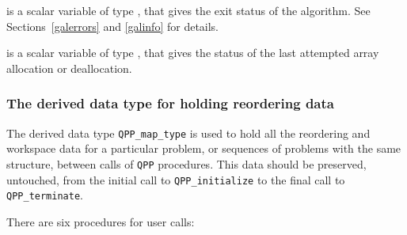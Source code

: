 \documentclass{galahad}
\newcommand{\packagename}{QPP}
\begin{document}
\begin{description}

 is a scalar variable of type \integer, that gives the
exit status of the algorithm. See Sections~\ref{galerrors} and \ref{galinfo}
for details.

 is a scalar variable of type \integer, that gives
the status of the last attempted array allocation or deallocation.

\end{description}


\subsubsection{The derived data type for holding reordering data}\label{typemap}
The derived data type 
{\tt \packagename\_map\_type} 
is used to hold all the reordering and workspace data for a particular 
problem, or sequences of problems with the same structure, between calls of 
{\tt \packagename} procedures. 
This data should be preserved, untouched, from the initial call to 
{\tt \packagename\_initialize}
to the final call to
{\tt \packagename\_terminate}.


\galarguments
There are six procedures for user calls:
\end{document}
